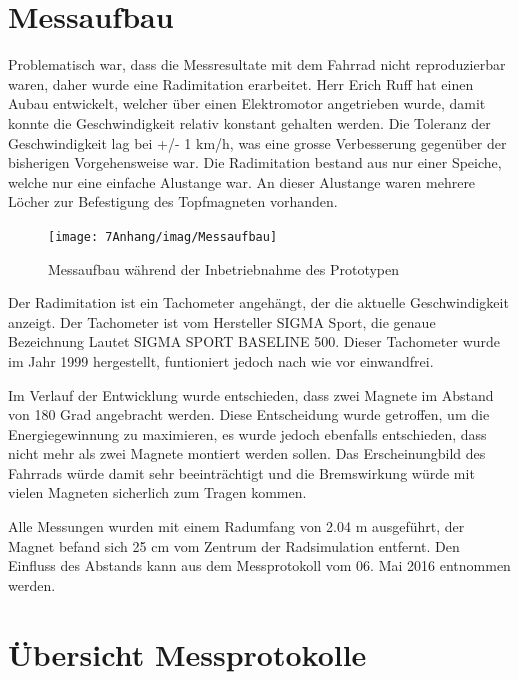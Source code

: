 \chapter{Messaufbau}
\label{messaufbau}
Problematisch war, dass die Messresultate mit dem Fahrrad nicht reproduzierbar waren, daher wurde eine Radimitation erarbeitet. Herr Erich Ruff hat einen Aubau entwickelt, welcher über einen Elektromotor angetrieben wurde, damit konnte die Geschwindigkeit relativ konstant gehalten werden. Die Toleranz der Geschwindigkeit lag bei +/- 1 km/h, was eine grosse Verbesserung gegenüber der bisherigen Vorgehensweise war.
Die Radimitation bestand aus nur einer Speiche, welche nur eine einfache Alustange war. An dieser Alustange waren mehrere Löcher zur Befestigung des Topfmagneten vorhanden.


\begin{figure}[ht]
    \texttt{[image: 7Anhang/imag/Messaufbau]}
	\caption{Messaufbau während der Inbetriebnahme des Prototypen}
	\label{messaufbau_anhang}
\end{figure}

Der Radimitation ist ein Tachometer angehängt, der die aktuelle Geschwindigkeit anzeigt. Der Tachometer ist vom Hersteller SIGMA Sport, die genaue Bezeichnung Lautet SIGMA SPORT BASELINE 500. Dieser Tachometer wurde im Jahr 1999 hergestellt, funtioniert jedoch nach wie vor einwandfrei.

Im Verlauf der Entwicklung wurde entschieden, dass zwei Magnete im Abstand von 180 Grad angebracht werden. Diese Entscheidung wurde getroffen, um die Energiegewinnung zu maximieren, es wurde jedoch ebenfalls entschieden, dass nicht mehr als zwei Magnete montiert werden sollen. Das Erscheinungbild des Fahrrads würde damit sehr beeinträchtigt und die Bremswirkung würde mit vielen Magneten sicherlich zum Tragen kommen.

Alle Messungen wurden mit einem Radumfang von 2.04 m ausgeführt, der Magnet befand sich 25 cm vom Zentrum der Radsimulation entfernt. Den Einfluss des Abstands kann aus dem Messprotokoll vom 06. Mai 2016 entnommen werden.

\chapter{Übersicht Messprotokolle}
\label{uebersicht_messprotokolle}

